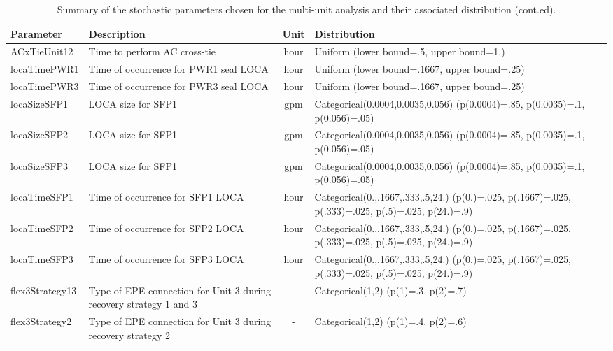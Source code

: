 \begin{table}
  \centering
  \begin{center}
      \begin{tabular}{ | l | p{5cm} | c | p{5cm} |}
        \hline
         \textbf{Parameter}          & \textbf{Description}                      & \textbf{Unit}   & \textbf{Distribution}                                         \\ \hline \hline
         ACxTieUnit12       & Time to perform AC cross-tie     & hour      & Uniform (lower bound=.5, upper bound=1.)             \\ \hline
         locaTimePWR1       & Time of occurrence for PWR1 seal LOCA & hour & Uniform (lower bound=.1667, upper bound=.25)         \\ \hline
         locaTimePWR3       & Time of occurrence for PWR3 seal LOCA & hour & Uniform (lower bound=.1667, upper bound=.25)         \\ \hline
         locaSizeSFP1       & LOCA size for SFP1               & gpm       & Categorical(0.0004,0.0035,0.056) (p(0.0004)=.85, p(0.0035)=.1, p(0.056)=.05)   \\ \hline
         locaSizeSFP2       & LOCA size for SFP1               & gpm       & Categorical(0.0004,0.0035,0.056) (p(0.0004)=.85, p(0.0035)=.1, p(0.056)=.05)   \\ \hline
         locaSizeSFP3       & LOCA size for SFP1               & gpm       & Categorical(0.0004,0.0035,0.056) (p(0.0004)=.85, p(0.0035)=.1, p(0.056)=.05)   \\ \hline    
         locaTimeSFP1       & Time of occurrence for SFP1 LOCA & hour      & Categorical(0.,.1667,.333,.5,24.) (p(0.)=.025, p(.1667)=.025, p(.333)=.025, p(.5)=.025, p(24.)=.9)  \\ \hline
         locaTimeSFP2       & Time of occurrence for SFP2 LOCA & hour      & Categorical(0.,.1667,.333,.5,24.) (p(0.)=.025, p(.1667)=.025, p(.333)=.025, p(.5)=.025, p(24.)=.9)  \\ \hline
         locaTimeSFP3       & Time of occurrence for SFP3 LOCA & hour      & Categorical(0.,.1667,.333,.5,24.) (p(0.)=.025, p(.1667)=.025, p(.333)=.025, p(.5)=.025, p(24.)=.9)  \\ \hline
         flex3Strategy13    & Type of EPE connection for Unit 3 during recovery strategy 1 and 3  & -      & Categorical(1,2) (p(1)=.3, p(2)=.7)             \\ \hline
         flex3Strategy2     & Type of EPE connection for Unit 3 during recovery strategy 2        & -      & Categorical(1,2) (p(1)=.4, p(2)=.6)             \\ 
        \hline
      \end{tabular}
  \end{center}
  \caption{Summary of the stochastic parameters chosen for the multi-unit analysis and their associated distribution (cont.ed).}
  \label{tab:stochasticParameters2}
\end{table}


